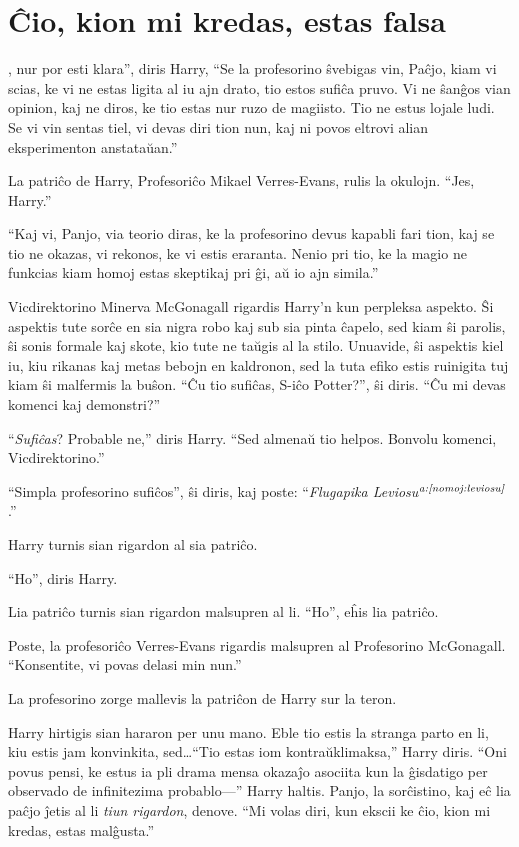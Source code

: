 \chapter{Ĉio, kion mi kredas, estas falsa}

, nur por esti klara'', diris Harry, ``Se la
profesorino ŝvebigas vin, Paĉjo, kiam vi scias, ke vi ne estas ligita al iu ajn
drato, tio estos sufiĉa pruvo. Vi ne ŝanĝos vian opinion, kaj ne diros, ke tio
estas nur ruzo de magiisto. Tio ne estus lojale ludi. Se vi vin sentas tiel, vi
devas diri tion nun, kaj ni povos eltrovi alian eksperimenton anstataŭan.''

La patriĉo de Harry, Profesoriĉo Mikael Verres-Evans, rulis la okulojn. ``Jes, Harry.''

``Kaj vi, Panjo, via teorio diras, ke la profesorino devus kapabli fari tion,
kaj se tio ne okazas, vi rekonos, ke vi estis eraranta. Nenio pri tio, ke la
magio ne funkcias kiam homoj estas skeptikaj pri ĝi, aŭ io ajn simila.''

Vicdirektorino Minerva McGonagall rigardis Harry'n kun perpleksa aspekto. Ŝi
aspektis tute sorĉe en sia nigra robo kaj sub sia pinta ĉapelo, sed kiam ŝi
parolis, ŝi sonis formale kaj skote, kio tute ne taŭgis al la stilo. Unuavide,
ŝi aspektis kiel iu, kiu rikanas kaj metas bebojn en kaldronon, sed la tuta
efiko estis ruinigita tuj kiam ŝi malfermis la buŝon. ``Ĉu tio sufiĉas, S-iĉo
Potter?'', ŝi diris. ``Ĉu mi devas komenci kaj demonstri?''

``\emph{Sufiĉas}? Probable ne,'' diris Harry. ``Sed almenaŭ tio helpos. Bonvolu
komenci, Vicdirektorino.''

``Simpla profesorino sufiĉos'', ŝi diris, kaj poste: ``\emph{Flugapika
Leviosu$^{\textit{a:\ref{nomoj:leviosu}}}$}.''

Harry turnis sian rigardon al sia patriĉo.

``Ho'', diris Harry.

Lia patriĉo turnis sian rigardon malsupren al li. ``Ho'', eĥis lia patriĉo.

Poste, la profesoriĉo Verres-Evans rigardis malsupren al Profesorino McGonagall.
``Konsentite, vi povas delasi min nun.''

La profesorino zorge mallevis la patriĉon de Harry sur la teron.

Harry hirtigis sian hararon per unu mano. Eble tio estis la stranga parto en li,
kiu estis jam konvinkita, sed\ldots ``Tio estas iom kontraŭklimaksa,'' Harry
diris. ``Oni povus pensi, ke estus ia pli drama mensa okazaĵo asociita kun la
ĝisdatigo per observado de infinitezima probablo—'' Harry haltis. Panjo, la
sorĉistino, kaj eĉ lia paĉjo ĵetis al li \emph{tiun rigardon}, denove. ``Mi
volas diri, kun ekscii ke ĉio, kion mi kredas, estas malĝusta.''

